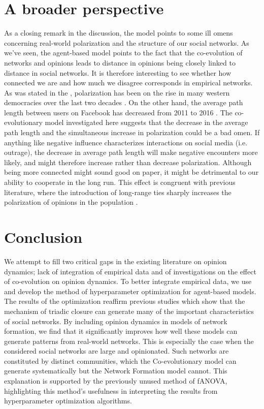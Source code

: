 \documentclass[11pt]{article}
\begin{document}
\section{A broader perspective}
As a closing remark in the discussion, the model points to some ill omens concerning real-world polarization and the structure of our social networks. 
As we've seen, the agent-based model points to the fact that the co-evolution of networks and opinions leads to distance in opinions being closely linked to distance in social networks. 
It is therefore interesting to see whether how connected we are and how much we disagree corresponds in empirical networks. 
As was stated in the \textit{}, polarization has been on the rise in many western democracies over the last two decades \cite{boxell_cross-country_2020,pew_research_center_political_2014}. On the other hand, the average path length between users on Facebook has decreased from 2011 to 2016 \cite{bhagat_three_2016}. The co-evolutionary model investigated here suggests that the decrease in the average path length and the simultaneous increase in polarization could be a bad omen. If anything like negative influence characterizes interactions on social media (i.e. outrage), the decrease in average path length will make negative encounters more likely, and might therefore increase rather than decrease polarization. Although being more connected might sound good on paper, it might be detrimental to our ability to cooperate in the long run. This effect is congruent with previous literature, where the introduction of long-range ties sharply increases the polarization of opinions in the population \cite{flache_small_2011,turner_paths_2018}.

\section{Conclusion}
We attempt to fill two critical gaps in the existing literature on opinion dynamics; lack of integration of empirical data and of investigations on the effect of co-evolution on opinion dynamics. To better integrate empirical data, we use and develop the method of hyperparameter optimization for agent-based models. The results of the optimization reaffirm previous studies which show that the mechanism of triadic closure can generate many of the important characteristics of social networks. By including opinion dynamics in models of network formation, we find that it significantly improves how well these models can generate patterns from real-world networks. This is especially the case when the considered social networks are large and opinionated. Such networks are constituted by distinct communities, which the Co-evolutionary model can generate systematically but the Network Formation model cannot. This explanation is supported by the previously unused method of fANOVA, highlighting this method's usefulness in interpreting the results from hyperparameter optimization algorithms.
\end{document}
